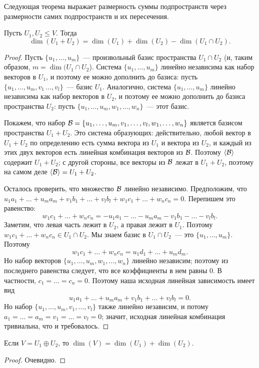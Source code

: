 Следующая теорема выражает размерность суммы подпространств
через размерности самих подпространств и их пересечения.
\begin{theorem}[Грассмана]
Пусть $U_1,U_2\leq V$. Тогда
$$
\dim(U_1+U_2) = \dim(U_1) + \dim(U_2) - \dim(U_1\cap U_2).
$$
\end{theorem}
\begin{proof}
Пусть $\{u_1,\dots,u_m\}$~--- произвольный базис пространства
$U_1\cap U_2$ (и, таким образом, $m = \dim(U_1\cap U_2$).
Система $\{u_1,\dots,u_m\}$ линейно независима как набор
векторов в $U_1$, и поэтому ее можно дополнить до базиса:
пусть $\{u_1,\dots,u_m,v_1\,\dots,v_l\}$~--- базис $U_1$.
Аналогично, система $\{u_1,\dots,u_m\}$ линейно независима
как набор векторов в $U_2$, и поэтому ее можно дополнить
до базиса пространства $U_2$: пусть
$\{u_1,\dots,u_m,w_1,\dots,w_n\}$~--- этот базис.

Покажем, что
набор $\mathcal B = \{u_1,\dots,u_m,v_1,\dots,v_l,w_1,\dots,w_n\}$
является базисом пространства $U_1+U_2$.
Это система образующих: действительно, любой вектор в $U_1+U_2$
по определению есть сумма вектора из $U_1$ и вектора из $U_2$,
и каждый из этих двух векторов есть линейная комбинация
векторов из $\mathcal B$. Поэтому $\langle\mathcal B\rangle$ содержит $U_1+U_2$;
с другой стороны, все векторы из $\mathcal B$ лежат в $U_1+U_2$,
поэтому на самом деле $\langle\mathcal B\rangle = U_1 + U_2$.

Осталось проверить, что множество $\mathcal B$ линейно независимо.
Предположим, что $u_1a_1+\dots+u_ma_m + v_1b_1+\dots+v_lb_l +
w_1c_1+\dots +w_nc_n = 0$. Перепишем это равенство:
$$
w_1c_1+\dots+w_nc_n = -u_1a_1-\dots-u_ma_m - v_1b_1-\dots-v_lb_l.
$$
Заметим, что левая часть лежит в $U_2$, а правая лежит в $U_1$.
Поэтому $w_1c_1+\dots+w_nc_n\in U_1\cap U_2$. Мы знаем базис
в $U_1\cap U_2$~--- это $\{u_1,\dots,u_m\}$. Поэтому
$$
w_1c_1 + \dots + w_nc_n = u_1d_1+\dots+u_md_m.
$$
Но набор векторов $\{u_1,\dots,u_m,w_1,\dots,w_n\}$
линейно независим; поэтому из последнего равенства следует,
что все коэффициенты в нем равны 0.
В частности, $c_1=\dots=c_n=0$.
Поэтому наша исходная линейная зависимость имеет вид
$$
u_1a_1+\dots+u_ma_m + v_1b_1+\dots+v_lb_l = 0.
$$
Но набор $\{u_1,\dots,u_m,v_1,\dots,v_l\}$ также линейно
независим, и потому $a_1 = \dots = a_m = v_1 = \dots = v_l = 0$;
значит, исходная линейная комбинация тривиальна,
что и требовалось.
\end{proof}

\begin{corollary}\label{cor:direct-sum-dimension}
Если $V = U_1\oplus U_2$, то $\dim(V) = \dim(U_1)+\dim(U_2)$.
\end{corollary}
\begin{proof}
Очевидно.
\end{proof}


